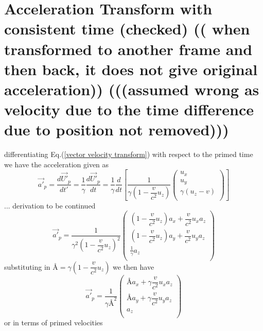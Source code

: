 \section{Acceleration Transform with consistent time (checked) (( when transformed to another frame and then back, it does not give original acceleration)) (((assumed wrong as velocity due to the time difference due to position not removed)))}
differentiating Eq.(\eqref{vector velocity transform}) with respect to the primed time we have the acceleration given as
\begin{equation}%
    \Vec{a'}_p= \dfrac{d\Vec{U'}_p}{dt'} = \dfrac{1}{\gamma}\dfrac{d\Vec{U'}_p}{dt} =  \dfrac{1}{\gamma}\dfrac{d}{dt} \left[ \dfrac{1}{\gamma\left(1- \dfrac{v}{c^2} u_z\right) }\begin{pmatrix}
    u_x \\ u_y  \\ \gamma \left( u_z  - v  \right) \\
    \end{pmatrix} \right]
\end{equation}%
... derivation to be continued
\begin{equation}%
    \Vec{a'}_p=  \dfrac{1}{\gamma^2\left(1- \dfrac{v}{c^2} u_z\right)^2 }\begin{pmatrix}
    \left(1- \dfrac{v}{c^2} u_z\right) a_x + \dfrac{v}{c^2} u_x a_z \\ \left(1- \dfrac{v}{c^2} u_z\right) a_y + \dfrac{v}{c^2} u_y a_z  \\ \frac{1}{\gamma} a_z \\
    \end{pmatrix}
\end{equation}%
substituting in $\text{\AA}= \gamma\left(1- \dfrac{v}{c^2} u_z\right)$ we then have
\begin{equation}%
    \Vec{a'}_p=  \dfrac{1}{\gamma\text{\AA}^2 }\begin{pmatrix}
    \text{\AA} a_x + \gamma \dfrac{v}{c^2} u_x a_z \\
    \text{\AA} a_y + \gamma \dfrac{v}{c^2} u_y a_z  \\
     a_z \\
    \end{pmatrix}
\end{equation}%
or in terms of primed velocities

